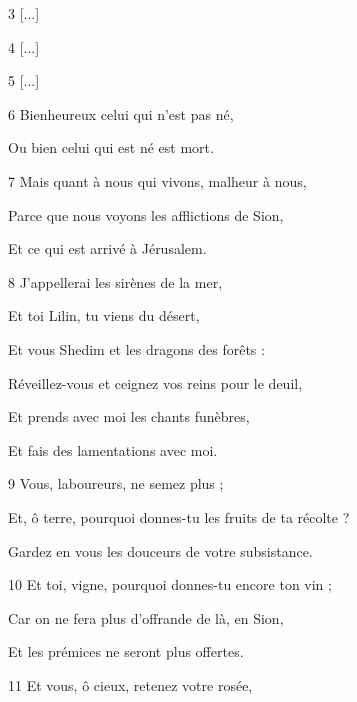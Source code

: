 \par 3 [...]

\par 4 [...]

\par 5 [...]

\par 6 Bienheureux celui qui n'est pas né,

\par Ou bien celui qui est né est mort.

\par 7 Mais quant à nous qui vivons, malheur à nous,

\par Parce que nous voyons les afflictions de Sion,

\par Et ce qui est arrivé à Jérusalem.

\par 8 J'appellerai les sirènes de la mer,

\par Et toi Lilin, tu viens du désert,

\par Et vous Shedim et les dragons des forêts :

\par Réveillez-vous et ceignez vos reins pour le deuil,

\par Et prends avec moi les chants funèbres,

\par Et fais des lamentations avec moi.

\par 9 Vous, laboureurs, ne semez plus ;

\par Et, ô terre, pourquoi donnes-tu les fruits de ta récolte ?

\par Gardez en vous les douceurs de votre subsistance.

\par 10 Et toi, vigne, pourquoi donnes-tu encore ton vin ;

\par Car on ne fera plus d'offrande de là, en Sion,

\par Et les prémices ne seront plus offertes.

\par 11 Et vous, ô cieux, retenez votre rosée,

